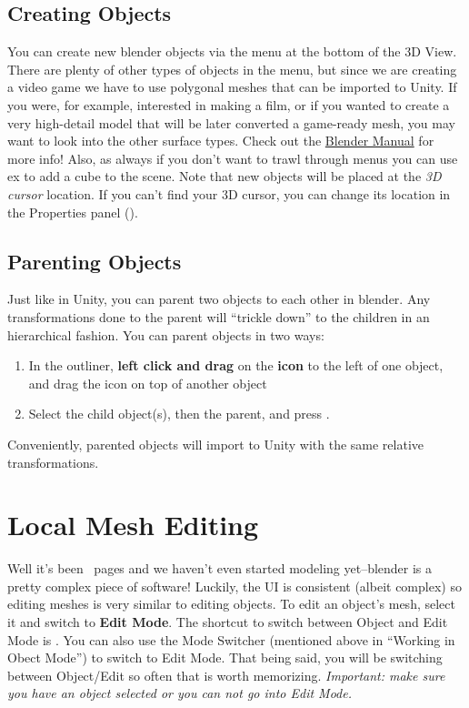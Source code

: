 \documentclass[11pt]{article}
\begin{document}
\subsection{Creating Objects}

You can create new blender objects via the  menu at the bottom of the 3D View.  There
are plenty of other types of objects in the  menu, but since we are creating a video game
we have to use polygonal meshes that can be imported to Unity.  If you were, for example, interested
in making a film, or if you wanted to create a very high-detail model that will be later converted
a game-ready mesh, you may want to look into the other surface types.  Check out the 
\href{https://docs.blender.org/manual/en/latest/modeling/index.html}{Blender Manual} for more info!
Also, as always if you don't want to trawl through menus you can use ex 
to add a cube to the scene.  Note that new objects will be placed at the \textit{3D cursor} location.
If you can't find your 3D cursor, you can change its location in the Properties panel ().

\subsection{Parenting Objects}

Just like in Unity, you can parent two objects to each other in blender.  Any transformations done
to the parent will ``trickle down'' to the children in an hierarchical fashion.  You can parent
objects in two ways:
\begin{enumerate}
    \item In the outliner, \textbf{left click and drag} on the \textbf{icon} to the left of one 
          object, and drag the icon on top of another object
    \item Select the child object(s), then the parent, and press .
\end{enumerate}
Conveniently, parented objects will import to Unity with the same relative transformations.

\section{Local Mesh Editing}

Well it's been \thepage\ pages and we haven't even started modeling yet--blender is a pretty complex
piece of software!  Luckily, the UI is consistent (albeit complex) so editing meshes is very similar
to editing objects.  To edit an object's mesh, select it and switch to \textbf{Edit Mode}.  The
shortcut to switch between Object and Edit Mode is .  You can also use the Mode Switcher
(mentioned above in ``Working in Obect Mode'') to switch to Edit Mode.  That being said, you will
be switching between Object/Edit so often that  is worth memorizing.  \textit{Important:
make sure you have an object selected or you can not go into Edit Mode.}
\end{document}
